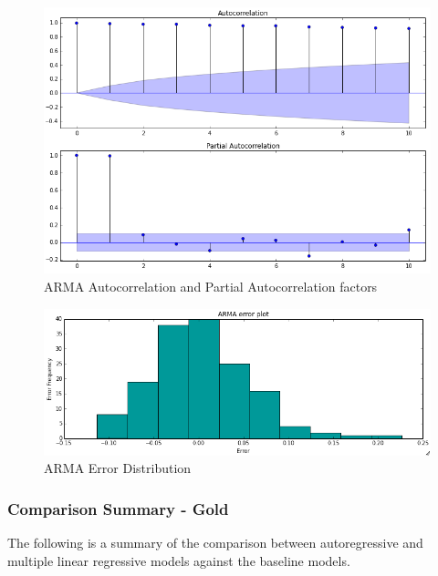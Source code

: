 \documentclass[runningheads]{llncs}
\begin{document}
\begin{center}
\begin{figure}
\centering
\includegraphics[width=\textwidth]{arma_autocorrelation_gold.png}
\caption{ARMA Autocorrelation and Partial Autocorrelation factors}
\label{fig:arma_autocorrelation_gold.png}
\end{figure}
\end{center}

\begin{center}

\begin{figure}
\centering
\includegraphics[width=\textwidth]{arma_error_histogram_gold.png}
\caption{ARMA Error Distribution}
\label{fig:arma_error_histogram_gold.png}
\end{figure}
\end{center}

\newpage
\subsubsection {Comparison Summary - Gold} The following is a summary of the comparison between autoregressive and multiple linear regressive models against the baseline models. \\
\end{document}
